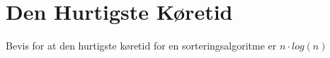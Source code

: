 \chapter{Den Hurtigste Køretid}
Bevis for at den hurtigste køretid for en sorteringsalgoritme er $n \cdot log(n)$
